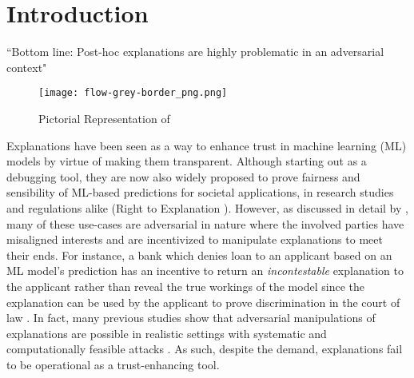 \section{Introduction}\label{sec:intro}
\begin{tcolorbox}[colback=blue!10, colframe=gray!50, boxrule=0.3mm, sharp corners]
``Bottom line: Post-hoc explanations
are highly problematic in an
adversarial context" \cite{bordt2022post}
\end{tcolorbox}


\begin{figure}[t]
    \centering \texttt{[image: flow-grey-border\_png.png]}
    \vspace{-25pt}
        \caption{Pictorial Representation of \name}
      \label{fig:pictorialexpproof}
\end{figure} 


Explanations have been seen as a way to enhance trust in machine learning (ML) models by virtue of making them transparent. Although starting out as a debugging tool, they are now also widely proposed to prove fairness and sensibility of ML-based predictions for societal applications, in research studies \citep{langer2021we, smuha2019eu, kastner2021relation, von2021transparency, leben2023explainable, karimi2020survey, wachter2017counterfactual, liao2021human} and regulations alike (Right to Explanation \cite{wikipedia_right_to_explanation}). However, as discussed in detail by \cite{bordt2022post}, many of these use-cases are adversarial in nature where the involved parties have misaligned interests and are incentivized to manipulate explanations to meet their ends. For instance, a bank which denies loan to an applicant based on an ML model's prediction has an incentive to return an \textit{incontestable} explanation to the applicant rather than reveal the true workings of the model since the explanation can be used by the applicant to prove discrimination in the court of law \cite{bordt2022post}. In fact, many previous studies show that adversarial manipulations of explanations are possible in realistic settings with systematic and computationally feasible attacks \cite{slack2020fooling, shahin2022washing, slack2021counterfactual, yadav2024influence}. As such, despite the demand, explanations fail to be operational as a trust-enhancing tool. %




